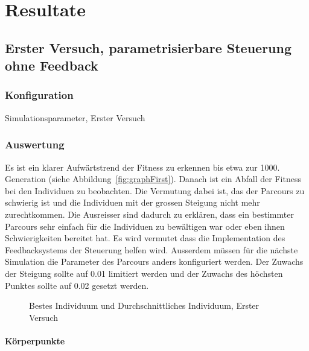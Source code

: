 %
%

\chapter{Resultate\label{chap:Resultate}}

\section{Erster Versuch, parametrisierbare Steuerung ohne Feedback}

  \subsection{Konfiguration}

    \begin{table}[H]
      \centering
      
      \caption{Simulationsparameter, Erster Versuch}
    \end{table}

  \subsection{Auswertung}

    Es ist ein klarer Aufwärtstrend der Fitness zu erkennen bis etwa zur 1000. Generation (siehe Abbildung~\vref{fig:graphFirst}).
    Danach ist ein Abfall der Fitness bei den Individuen zu beobachten.
    Die Vermutung dabei ist, das der Parcours zu schwierig ist und die Individuen
    mit der grossen Steigung nicht mehr zurechtkommen.
    Die Ausreisser sind dadurch zu erklären,
    dass ein bestimmter Parcours sehr einfach für die Individuen zu bewältigen war oder eben ihnen Schwierigkeiten bereitet hat.
    Es wird vermutet dass die Implementation des Feedbacksystems der Steuerung helfen wird.
    Ausserdem müssen für die nächste Simulation die Parameter des Parcours anders konfiguriert werden.
    Der Zuwachs der Steigung sollte auf 0.01 limitiert werden und der Zuwachs des höchsten Punktes
    sollte auf 0.02 gesetzt werden.

    \begin{figure}
      \centering
      
      \caption{Bestes Individuum und Durchschnittliches Individuum, Erster Versuch\label{fig:graphFirst}}
    \end{figure}

    \subsubsection{Körperpunkte\label{subsub:bp}}

